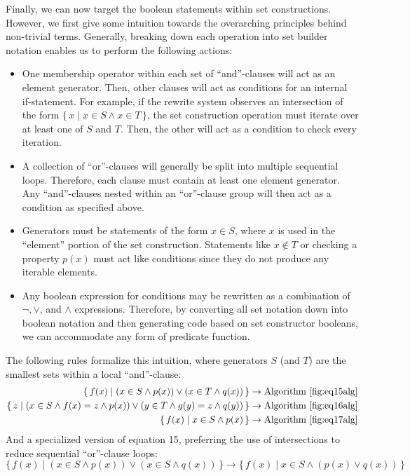\documentclass{article}
\newcommand{\Set}[2]{%
  \{\, #1 \mid #2 \, \}%
}
\begin{document}
Finally, we can now target the boolean statements within set constructions. However, we first give some intuition towards the overarching principles behind non-trivial terms. Generally, breaking down each operation into set builder notation enables us to perform the following actions:
\begin{itemize}
  \item One membership operator within each set of ``and''-clauses will act as an element generator. Then, other clauses will act as conditions for an internal if-statement. For example, if the rewrite system observes an intersection of the form $\Set{x}{x \in S \land x \in T}$, the set construction operation must iterate over at least one of $S$ and $T$. Then, the other will act as a condition to check every iteration.
  \item A collection of ``or''-clauses will generally be split into multiple sequential loops. Therefore, each clause must contain at least one element generator. Any ``and''-clauses nested within an ``or''-clause group will then act as a condition as specified above.
  \item Generators must be statements of the form $x \in S$, where $x$ is used in the ``element'' portion of the set construction. Statements like $x \notin T$ or checking a property $p(x)$ must act like conditions since they do not produce any iterable elements.
  \item Any boolean expression for conditions may be rewritten as a combination of $\lnot, \lor$, and $\land$ expressions. Therefore, by converting all set notation down into boolean notation and then generating code based on set constructor booleans, we can accommodate any form of predicate function.
\end{itemize}

The following rules formalize this intuition, where generators $S$ (and $T$) are the smallest sets within a local ``and''-clause:
\begin{align}
  \Set{f(x)}{(x \in S \land p(x)) \lor (x \in T \land q(x))} &\rightarrow \text{Algorithm~\ref{fig:eq15alg}}\\
  \Set{z}{(x \in S \land f(x) = z \land p(x)) \lor (y \in T \land g(y) = z \land q(y))} &\rightarrow \text{Algorithm~\ref{fig:eq16alg}}\\
  \Set{f(x)}{x \in S \land p(x)} &\rightarrow \text{Algorithm~\ref{fig:eq17alg}}
\end{align}
And a specialized version of equation 15, preferring the use of intersections to reduce sequential ``or''-clause loops:
\begin{equation}
  \Set{f(x)}{(x \in S \land p(x)) \lor (x \in S \land q(x))} \rightarrow \Set{f(x)}{x \in S \land (p(x) \lor q(x))}
\end{equation}
\end{document}
